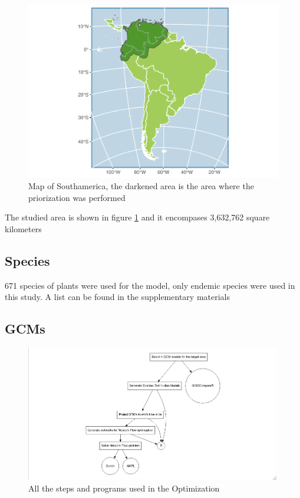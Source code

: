 \documentclass[]{article}
\begin{document}
\begin{figure}

{\centering \includegraphics{NFPaper_files/figure-latex/MapArea-1} 

}

\caption{Map of Southamerica, the darkened area is the area where the priorization was performed}\label{fig:MapArea}
\end{figure}

The studied area is shown in figure \ref{fig:MapArea} and it encompases 3,632,762 square kilometers

\hypertarget{species}{%
\subsection{Species}\label{species}}

671 species of plants were used for the model, only endemic species were used in this study. A list can be found in the supplementary materials

\hypertarget{gcms}{%
\subsection{GCMs}\label{gcms}}

\begin{figure}
\includegraphics[width=4.39in]{Diag1} \caption{All the steps and programs used in the Optimization}\label{fig:Diagrama}
\end{figure}
\end{document}
